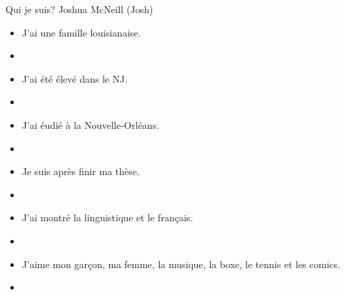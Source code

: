 \begin{frame}{Qui je suis? }
  \footnotesize
  Joshua McNeill (Josh)
  \begin{itemize}
    \item J'ai une famille louisianaise.
    \item[] 
    \item<2-> J'ai été élevé dans le NJ.
    \item<2->[] 
    \item<3-> J'ai éudié à la Nouvelle-Orléans.
    \item<3->[] 
    \item<4-> Je suis après finir ma thèse.
    \item<4->[] 
    \item<5-> J'ai montré la linguistique et le français.
    \item<5->[] 
    \item<6-> J'aime mon garçon, ma femme, la musique, la boxe, le tennis et les comics.
    \item<6->[] 
  \end{itemize}
\end{frame}
